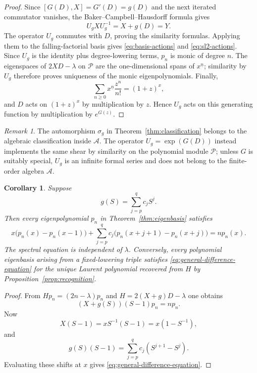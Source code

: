 \documentclass[11pt,reqno]{amsart}
\numberwithin{equation}{section}
\newtheorem{corollary}[theorem]{Corollary}
\theoremstyle{definition}
\theoremstyle{remark}
\newtheorem{remark}[theorem]{Remark}
\newcommand{\algA}{\mathcal A}
\newcommand{\calP}{\mathcal P}
\begin{document}
\begin{proof}
Since $[G(D),X]=G'(D)=g(D)$ and the next iterated commutator vanishes, the Baker--Campbell--Hausdorff formula gives
\[
 U_gXU_g^{-1}=X+g(D)=Y.
\]
The operator $U_g$ commutes with $D$, proving the similarity formulas.  Applying them to the falling-factorial basis gives \eqref{eq:basis-actions} and \eqref{eq:sl2-actions}.  Since $U_g$ is the identity plus degree-lowering terms, $p_n$ is monic of degree $n$.  The eigenspaces of $2XD-\lambda$ on $\calP$ are the one-dimensional spans of $x^{\underline n}$; similarity by $U_g$ therefore proves uniqueness of the monic eigenpolynomials.  Finally,
\[
 \sum_{n\ge0}x^{\underline n}\frac{z^n}{n!}=(1+z)^x,
\]
and $D$ acts on $(1+z)^x$ by multiplication by $z$.  Hence $U_g$ acts on this generating function by multiplication by $e^{G(z)}$.
\end{proof}

\begin{remark}\label{rem:shear-similarity}
The automorphism $\sigma_g$ in Theorem~\ref{thm:classification} belongs to the algebraic classification inside $\algA$.  The operator $U_g=\exp(G(D))$ instead implements the same shear by similarity on the polynomial module $\calP$; unless $G$ is suitably special, $U_g$ is an infinite formal series and does not belong to the finite-order algebra $\algA$.
\end{remark}

\begin{corollary}\label{cor:explicit-equation}
Suppose
\[
 g(S)=\sum_{j=p}^{q}c_jS^j.
\]
Then every eigenpolynomial $p_n$ in Theorem~\ref{thm:eigenbasis} satisfies
\begin{equation}\label{eq:general-difference-equation}
 x\bigl(p_n(x)-p_n(x-1)\bigr)
 +\sum_{j=p}^{q}c_j\bigl(p_n(x+j+1)-p_n(x+j)\bigr)
 =np_n(x).
\end{equation}
The spectral equation is independent of $\lambda$.  Conversely, every polynomial eigenbasis arising from a fixed-lowering triple satisfies \eqref{eq:general-difference-equation} for the unique Laurent polynomial recovered from $H$ by Proposition~\ref{prop:recognition}.
\end{corollary}

\begin{proof}
From $Hp_n=(2n-\lambda)p_n$ and $H=2(X+g)D-\lambda$ one obtains
\[
 (X+g(S))(S-1)p_n=np_n.
\]
Now
\[
 X(S-1)=xS^{-1}(S-1)=x(1-S^{-1}),
\]
and
\[
 g(S)(S-1)=\sum_{j=p}^{q}c_j(S^{j+1}-S^j).
\]
Evaluating these shifts at $x$ gives \eqref{eq:general-difference-equation}.
\end{proof}
\end{document}
